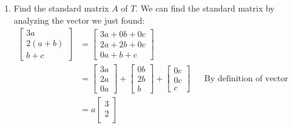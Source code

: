 \documentclass[10pt,letterpaper,final]{report}
\newcommand{\reason}[1]{&& \text{#1}}
\begin{document}
\begin{enumerate}[label=(\alph*)]
  \item Find the standard matrix $A$ of $T$.
        We can find the standard matrix by analyzing the vector we just found:
        \begin{align*}
          \begin{bmatrix}
            3a     \\
            2(a+b) \\
            b+c
          \end{bmatrix} & = \begin{bmatrix}
                              3a + 0b + 0c \\
                              2a + 2b + 0c \\
                              0a + b + c
                            \end{bmatrix}                                                                                            \\[1ex]
                            & = \begin{bmatrix}
                                  3a \\
                                  2a \\
                                  0a
                                \end{bmatrix} + \begin{bmatrix}
                                                  0b \\
                                                  2b \\
                                                  b
                                                \end{bmatrix} + \begin{bmatrix}
                                                                  0c \\
                                                                  0c \\
                                                                  c
                                                                \end{bmatrix} \reason{By definition of vector addition}                 \\[1ex]
                            & = a\begin{bmatrix}
                                   3 \\
                                   2 \\

\end{bmatrix}
\end{align*}
\end{enumerate}
\end{document}
